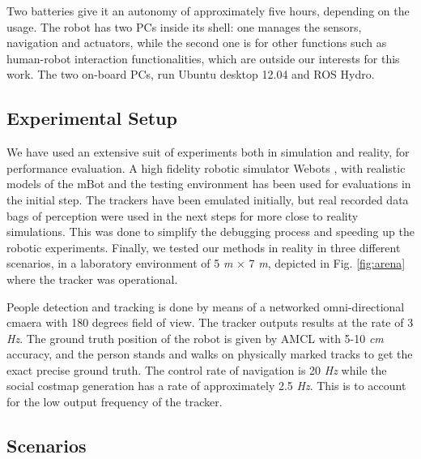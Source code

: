 Two batteries give it an autonomy of approximately five hours, depending on the usage.
The robot has two PCs inside its shell: one manages the sensors, navigation and actuators, while the second one is for other functions such as human-robot interaction functionalities, which are outside our interests for this work. The two on-board PCs, run Ubuntu desktop 12.04 and ROS Hydro. 


\subsection{Experimental Setup}
\label{sec:Experimental_setup}


We have used an extensive suit of experiments both in simulation and reality, for performance evaluation. A high fidelity robotic simulator Webots \cite{michel1998webots}, with realistic models of the mBot and the testing environment has been used for evaluations in the initial step. The trackers have been emulated initially, but real recorded data bags of perception were used in the next steps for more close to reality simulations. This was done to simplify the debugging process and speeding up the robotic experiments. %
Finally, we tested our methods in reality in three different scenarios, in a laboratory environment of 5 \textit{m} $\times$ 7 \textit{m}, depicted in Fig. \ref{fig:arena} where the tracker was operational.
 


People detection and tracking is done by means of a networked omni-directional cmaera with 180 degrees field of view. The tracker outputs results at the rate of 3 \textit{Hz}. The ground truth position of the robot is given by AMCL with 5-10 \textit{cm} accuracy, and the person stands and walks on physically marked tracks to get the exact precise ground truth.
The control rate of navigation is 20 \textit{Hz} while the social costmap generation has a rate of approximately 2.5 \textit{Hz}. This is to account for the low output frequency of the tracker.


\subsection{Scenarios}
\label{sec:scenarios}

